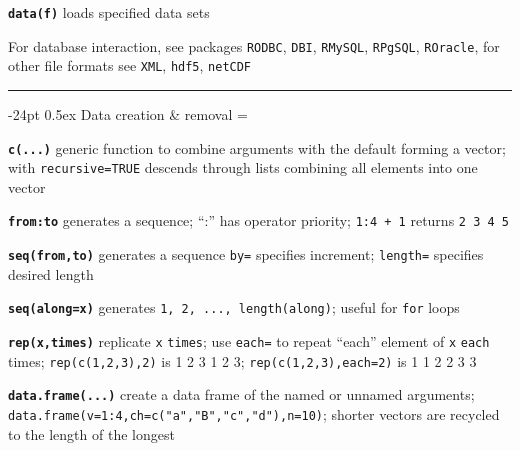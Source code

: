 \documentclass[8pt,landscape]{article}
\makeatletter
\renewcommand\section{\@startsection{section}{1}{0mm}%
                                     {-24pt}%
                                     {0.5ex}%
                                {\color{blue}\normalfont\large\bfseries}}
\newcommand{\code}{\texttt}
\newcommand{\bcode}[1]{\texttt{\textbf{#1}}}
\makeatother
\begin{document}
\begin{multicols*}{3}
\bcode{data(f)} loads specified data sets

                 


% 

\bigskip

For database interaction, see packages \code{RODBC}, \code{DBI},
\code{RMySQL}, \code{RPgSQL}, \code{ROracle}, for other file formats see
\code{XML}, \code{hdf5}, \code{netCDF} 


\bigskip

\rule{.3\textwidth}{0.4pt}


\section{Data creation \& removal}
\everypar={\hangindent=9mm}


\bcode{c(...)} generic function to combine arguments with the default
forming a vector;
with \code{recursive=TRUE} descends through lists combining all elements
into one vector

\bcode{from:to} generates a sequence; ``:'' has operator priority; \code{1:4
+ 1} returns \code{2 3 4 5}

\bcode{seq(from,to)} generates a sequence
\code{by=} specifies increment; \code{length=} specifies desired length

\bcode{seq(along=x)} generates \code{1, 2, ..., length(along)}; useful for
\code{for} loops

\bcode{rep(x,times)} replicate \code{x} \code{times}; use \code{each=}
to repeat ``each'' element of \code{x} \code{each} times;
\code{rep(c(1,2,3),2)} is 1 2 3 1 2 3; \code{rep(c(1,2,3),each=2)} is 1 1 2 2 3 3 

\bcode{data.frame(...)} create a data frame of the named or unnamed arguments;
  \code{data.frame(v=1:4,ch=c("a","B","c","d"),n=10)}; shorter vectors
  are recycled to the length of the longest 


\end{multicols*}
\end{document}

